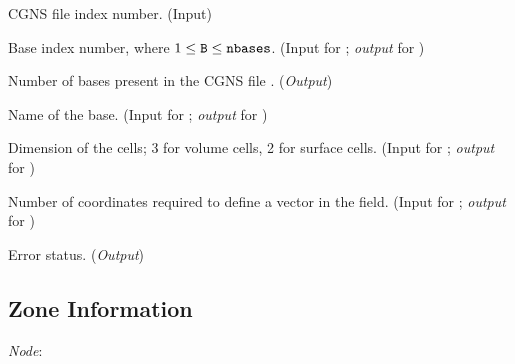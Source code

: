 \begin{Ventryi}{}\raggedright
\item [\fort{fn}]
      CGNS file index number.
      (\textcolor{input}{Input})
\item [\fort{B}]
      Base index number, where $1 \leq \text{{\normalfont\texttt{B}}} \leq \text{{\normalfont\texttt{nbases}}}$.
      (\textcolor{input}{Input} for ;
      \textcolor{output}{\textit{output}} for )
\item [\fort{nbases}]
      Number of bases present in the CGNS file .
      (\textcolor{output}{\textit{Output}})
\item [\fort{basename}]
      Name of the base.
      (\textcolor{input}{Input} for ;
      \textcolor{output}{\textit{output}} for )
\item [\fort{cell\_dim}]
      Dimension of the cells; 3 for volume cells, 2 for surface cells.
      (\textcolor{input}{Input} for ;
      \textcolor{output}{\textit{output}} for )
\item [\fort{phys\_dim}]
      Number of coordinates required to define a vector in the field.
      (\textcolor{input}{Input} for ;
      \textcolor{output}{\textit{output}} for )
\item [\fort{ier}]
      Error status.
      (\textcolor{output}{\textit{Output}})
\end{Ventryi}

\subsection{Zone Information}
\label{s:zone}

\noindent
\textit{Node}: 

